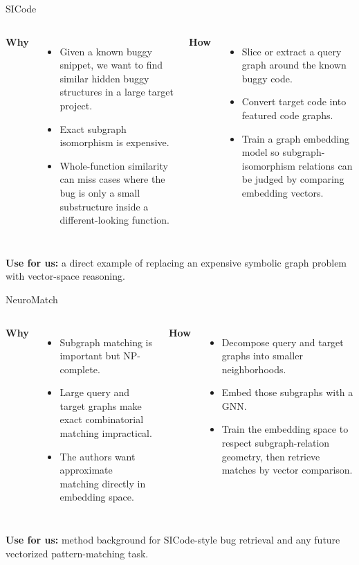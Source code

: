 \documentclass[10pt]{beamer}
\begin{document}
\begin{frame}{SICode}
  \begin{columns}[T,onlytextwidth]
    \textbf{Why}
    \begin{itemize}
      \item Given a known buggy snippet, we want to find similar hidden buggy structures in a large target project.
      \item Exact subgraph isomorphism is expensive.
      \item Whole-function similarity can miss cases where the bug is only a small substructure inside a different-looking function.
    \end{itemize}

    \textbf{How}
    \begin{itemize}
      \item Slice or extract a query graph around the known buggy code.
      \item Convert target code into featured code graphs.
      \item Train a graph embedding model so subgraph-isomorphism relations can be judged by comparing embedding vectors.
    \end{itemize}
  \end{columns}

  \vspace{0.25cm}
  \textbf{Use for us:} a direct example of replacing an expensive symbolic graph problem with vector-space reasoning.
\end{frame}

\begin{frame}{NeuroMatch}
  \begin{columns}[T,onlytextwidth]
    \textbf{Why}
    \begin{itemize}
      \item Subgraph matching is important but NP-complete.
      \item Large query and target graphs make exact combinatorial matching impractical.
      \item The authors want approximate matching directly in embedding space.
    \end{itemize}

    \textbf{How}
    \begin{itemize}
      \item Decompose query and target graphs into smaller neighborhoods.
      \item Embed those subgraphs with a GNN.
      \item Train the embedding space to respect subgraph-relation geometry, then retrieve matches by vector comparison.
    \end{itemize}
  \end{columns}

  \vspace{0.25cm}
  \textbf{Use for us:} method background for SICode-style bug retrieval and any future vectorized pattern-matching task.
\end{frame}
\end{document}
